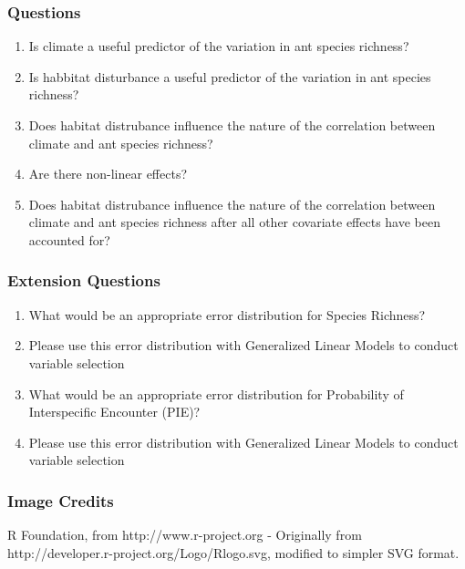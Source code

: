 \documentclass[xcolor=dvipsnames]{beamer}
\begin{document}
\begin{frame}
\frametitle{Questions}
\begin{enumerate}
\item Is climate a useful predictor of the variation in ant species richness?
\item Is habbitat disturbance a useful predictor of the variation in ant species richness?
\item Does habitat distrubance influence the nature of the correlation between climate and ant species richness?
\item Are there non-linear effects?
\item Does habitat distrubance influence the nature of the correlation between climate and ant species richness after all other covariate effects have been accounted for?
\end{enumerate}
\end{frame}

\begin{frame}
\frametitle{Extension Questions}
\begin{enumerate}
\item What would be an appropriate error distribution for Species Richness?
\item Please use this error distribution with Generalized Linear Models to conduct variable selection
\item What would be an appropriate error distribution for Probability of Interspecific Encounter (PIE)?
\item Please use this error distribution with Generalized Linear Models to conduct variable selection
\end{enumerate}
\end{frame}



\begin{frame} 
\frametitle{Image Credits}
R Foundation, from http://www.r-project.org - Originally from http://developer.r-project.org/Logo/Rlogo.svg, modified to simpler SVG format.
%
\end{frame}
\end{document}
